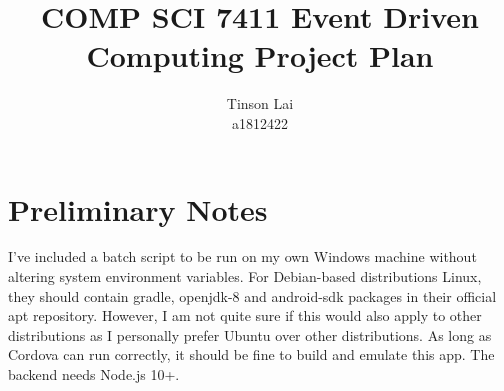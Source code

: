 \documentclass[12pt]{article}
\title{COMP SCI 7411 Event Driven Computing Project Plan}
\author{Tinson Lai \\ a1812422}
\date{}
\begin{document}
\maketitle

\section{Preliminary Notes}

I've included a batch script to be run on my own Windows machine without altering system environment variables. For Debian-based distributions Linux, they should contain gradle, openjdk-8 and android-sdk packages in their official apt repository. However, I am not quite sure if this would also apply to other distributions as I personally prefer Ubuntu over other distributions. As long as Cordova can run correctly, it should be fine to build and emulate this app. The backend needs Node.js 10+.
\end{document}
